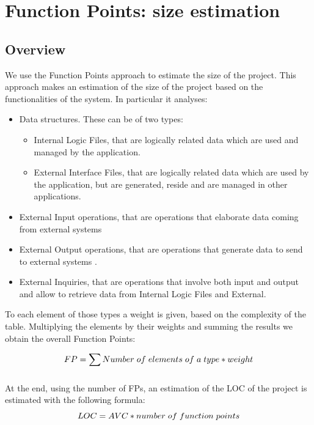 \section{Function Points: size estimation}
\subsection{Overview}
We use the Function Points approach to estimate the size of the project. This approach makes an estimation of the size of the project based on the functionalities of the system. In particular it analyses:
\begin{itemize}
\item Data structures. These can be of two types:
	\begin{itemize}[label={-}]
	\item Internal Logic Files, that are logically related data which are used and managed by the application.
	\item External Interface Files, that are logically related data which are used by the application, but are generated, reside and are managed in other applications.
	\end{itemize}
\item External Input operations, that are operations that elaborate data coming from external systems
\item External Output operations, that are operations that generate data to send to external systems .
\item External Inquiries, that are operations that involve both input and output and allow to retrieve data from Internal Logic Files and External.
\end{itemize} 
To each element of those types a weight is given, based on the complexity of the table.\newline
Multiplying the elements by their weights and summing the results we obtain the overall Function Points:\newline

\begin{equation}
FP = \sum_{}{}{Number\hspace{0.1 cm} of\hspace{0.1 cm} elements\hspace{0.1 cm} of\hspace{0.1 cm} a\hspace{0.1 cm} type * weight} 
\end{equation}

At the end, using the number of FPs, an estimation of the LOC of the project is estimated with the following formula:
\begin{equation}
LOC = AVC * number\hspace{0.1 cm} of\hspace{0.1 cm} function\hspace{0.1 cm} points
\end{equation}

